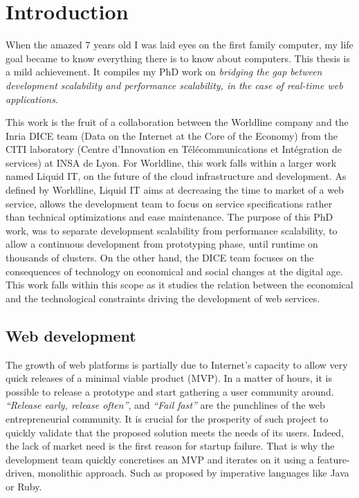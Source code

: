 \chapter{Introduction} \label{chapter:conclusion}
\minitoc
\eject

When the amazed 7 years old I was laid eyes on the first family computer, my life goal became to know everything there is to know about computers.
This thesis is a mild achievement.
It compiles my PhD work on
\textit{bridging the gap between development scalability and performance scalability, in the case of real-time web applications}.


This work is the fruit of a collaboration between the Worldline company and the Inria DICE team (Data on the Internet at the Core of the Economy) from the CITI laboratory (Centre d’Innovation en Télécommunications et Intégration
de services) at INSA de Lyon.
For Worldline, this work falls within a larger work named Liquid IT, on the future of the cloud infrastructure and development.
As defined by Worldline, Liquid IT aims at decreasing the time to market of a web service, allows the development team to focus on service specifications rather than technical optimizations and ease maintenance.
The purpose of this PhD work, was to separate development scalability from performance scalability, to allow a continuous development from prototyping phase, until runtime on thousands of clusters.
On the other hand, the DICE team focuses on the consequences of technology on economical and social changes at the digital age.
This work falls within this scope as it studies the relation between the economical and the technological constraints driving the development of web services.

\section{Web development}

The growth of web platforms is partially due to Internet's capacity to allow very quick releases of a minimal viable product (MVP).
In a matter of hours, it is possible to release a prototype and start gathering a user community around.
\textit{``Release early, release often''}, and \textit{``Fail fast''} are the punchlines of the web entrepreneurial community.
It is crucial for the prosperity of such project to quickly validate that the proposed solution meets the needs of its users.
Indeed, the lack of market need is the first reason for startup failure.
That is why the development team quickly concretises an MVP and iterates on it using a feature-driven, monolithic approach.
Such as proposed by imperative languages like Java or Ruby.

